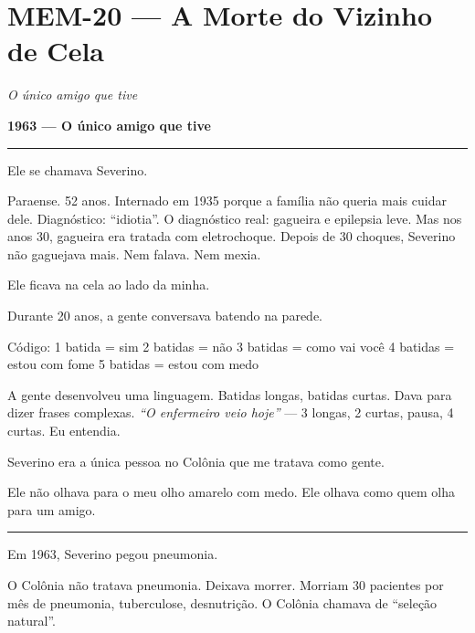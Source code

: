 \section*{\textbf{MEM-20} --- A Morte do Vizinho de Cela}

\noindent \textit{O único amigo que tive}

\noindent \textbf{1963 --- O único amigo que tive}

\vspace{0.5em}\noindent\rule{\textwidth}{0.5pt}\vspace{0.5em}

\noindent Ele se chamava Severino.

\noindent Paraense. 52 anos. Internado em 1935 porque a família não queria mais cuidar dele. Diagnóstico: \textquotedblleft{}idiotia\textquotedblright{}. O diagnóstico real: gagueira e epilepsia leve. Mas nos anos 30, gagueira era tratada com eletrochoque. Depois de 30 choques, Severino não gaguejava mais. Nem falava. Nem mexia.

\noindent Ele ficava na cela ao lado da minha.

\noindent Durante 20 anos, a gente conversava batendo na parede.

\noindent Código:
1 batida = sim
2 batidas = não
3 batidas = como vai você
4 batidas = estou com fome
5 batidas = estou com medo

\noindent A gente desenvolveu uma linguagem. Batidas longas, batidas curtas. Dava para dizer frases complexas. \textit{\textquotedblleft{}O enfermeiro veio hoje\textquotedblright{}} --- 3 longas, 2 curtas, pausa, 4 curtas. Eu entendia.

\noindent Severino era a única pessoa no Colônia que me tratava como gente.

\noindent Ele não olhava para o meu olho amarelo com medo. Ele olhava como quem olha para um amigo.

\vspace{0.5em}\noindent\rule{\textwidth}{0.5pt}\vspace{0.5em}

\noindent Em 1963, Severino pegou pneumonia.

\noindent O Colônia não tratava pneumonia. Deixava morrer. Morriam 30 pacientes por mês de pneumonia, tuberculose, desnutrição. O Colônia chamava de \textquotedblleft{}seleção natural\textquotedblright{}.


